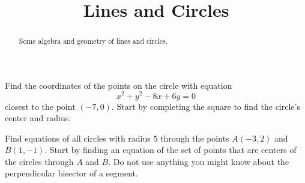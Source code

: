 \documentclass{ximera}
\title{Lines and Circles}
\begin{document}
\begin{abstract}
Some algebra and geometry of lines and circles.
\end{abstract}
\maketitle


\begin{question} \label{Qdsfr3gg5rtgt}
Find the coordinates of the points on the circle with equation
\[
   x^2 + y^2 - 8x + 6y = 0
\]
closest to the point $(-7,0)$. Start by completing the square to find the circle's center and radius.
\end{question}

\begin{question}  \label{Qdft45432423}
Find equations of all circles with radius $5$ through the points $A(-3,2)$ and $B(1,-1)$. Start by finding an equation of the set of points that are centers of the circles through $A$ and $B$. Do not use anything you might know about the perpendicular bisector of a segment.
\end{question}
\end{document}
